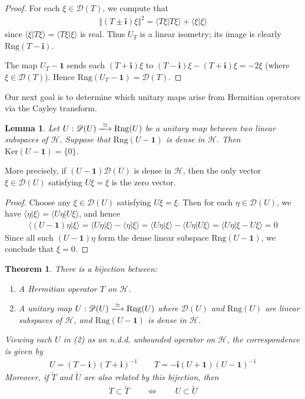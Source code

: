 \documentclass[12pt,b5paper,notitlepage]{article}
\theoremstyle{definition}
\theoremstyle{plain}
\newtheorem{thm}[df]{Theorem}
\newtheorem{lm}[df]{Lemma}
\newcommand{\wtd}{\widetilde}
\newcommand{\idt}{\mathbf{1}}
\newcommand{\Dom}{\mathscr{D}}
\newcommand{\bk}[1]{\langle {#1}\rangle}
\newcommand{\im}{\mathbf{i}}
\newcommand{\Ker}{\mathrm{Ker}}
\newcommand{\Rng}{\mathrm{Rng}}
\newcommand{\MH}{\mathcal H}
\numberwithin{equation}{section}
\begin{document}
\begin{proof}
For each $\xi\in\Dom(T)$, we compute that
\begin{align}\label{eq197}
\Vert (T\pm\im)\xi\Vert^2=\bk{T\xi|T\xi}+\bk{\xi|\xi}
\end{align}
since $\bk{\xi|T\xi}=\bk{T\xi|\xi}$ is real. Thus $U_T$ is a linear isometry; its image is clearly $\Rng(T-\im)$.

The map $U_T-\idt$ sends each $(T+\im)\xi$ to $(T-\im)\xi-(T+\im)\xi=-2\xi$ (where $\xi\in\Dom(T)$). Hence $\Rng(U_T-\idt)=\Dom(T)$.
\end{proof}


Our next goal is to determine which unitary maps arise from Hermitian operators via the Cayley transform.


\begin{lm}\label{lb378}
Let $U:\Dom(U)\xlongrightarrow{\simeq}\Rng(U)$ be a unitary map between two linear subspaces of $\MH$. Suppose that $\Rng(U-\idt)$ is dense in $\MH$. Then $\Ker(U-\idt)=\{0\}$.
\end{lm}

More precisely, if $(U-\idt)\Dom(U)$ is dense in $\MH$, then the only vector $\xi\in\Dom(U)$ satisfying $U\xi=\xi$ is the zero vector.


\begin{proof}
Choose any $\xi\in\Dom(U)$ satisfying $U\xi=\xi$. Then for each $\eta\in\Dom(U)$, we have $\bk{\eta|\xi}=\bk{U\eta|U\xi}$, and hence
\begin{align*}
\bk{(U-\idt)\eta|\xi}=\bk{U\eta|\xi}-\bk{\eta|\xi}=\bk{U\eta|\xi}-\bk{U\eta|U\xi}=\bk{U\eta|\xi-U\xi}=0
\end{align*}
Since all such $(U-\idt)\eta$ form the dense linear subspace $\Rng(U-\idt)$, we conclude that $\xi=0$.
\end{proof}


\begin{thm}\label{lb383}
There is a bijection between:
\begin{enumerate}
\item[(1)] A Hermitian operator $T$ on $\MH$.
\item[(2)] A unitary map $U:\Dom(U)\xlongrightarrow{\simeq}\Rng(U)$ where $\Dom(U)$ and $\Rng(U)$ are linear subspaces of $\MH$, and $\Rng(U-\idt)$ is dense in $\MH$.
\end{enumerate}
Viewing each $U$ in (2) as an n.d.d. unbounded operator on $\MH$, the correspondence is given by
\begin{align*}
U=(T-\im)(T+\im)^{-1}\qquad T=-\im(U+\idt)(U-\idt)^{-1}
\end{align*} 
Moreover, if $\wtd T$ and $\wtd U$ are also related by this bijection, then
\begin{align}\label{eq194}
T\subset\wtd T\qquad\Longleftrightarrow\qquad U\subset\wtd U
\end{align}
\end{thm}
\end{document}
